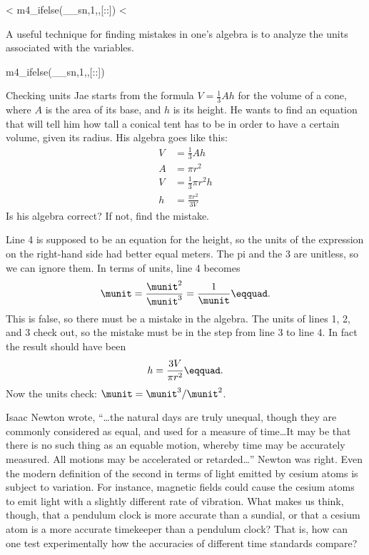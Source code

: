 <%
m4_ifelse(__sn,1,,[:\vfill:])
<%

A useful technique for finding mistakes in one's algebra is to analyze
the units associated with the variables.

m4_ifelse(__sn,1,,[:\pagebreak[4]:])

\begin{eg}{Checking units}\label{eg:checking-units}
\egquestion
Jae starts from the formula $V=\frac{1}{3}Ah$ for the volume of a
cone, where $A$ is the area of its base, and $h$ is its height.
He wants to find an equation that will tell him how tall a conical
tent has to be in order to have a certain volume, given its radius.
His algebra goes like this:
\begin{align}
  V &= \frac{1}{3}Ah \\
  A &= \pi r^2 \\
  V &= \frac{1}{3}\pi r^2 h\\
  h &= \frac{\pi r^2}{3V}
\end{align}
Is his algebra correct? If not, find the mistake.

\eganswer
Line 4 is supposed to be an equation for the height, so the units of the
expression on the right-hand side had better equal meters.
The pi and the 3 are unitless, so we can ignore them.
In terms of units, line 4 becomes
\begin{equation*}
  \munit = \frac{\munit^2}{\munit^3} = \frac{1}{\munit}\eqquad.
\end{equation*}
This is false, so there must be a mistake in the algebra. The units
of lines 1, 2, and 3 check out, so the mistake must be in the step
from line 3 to line 4. In fact the result should have been
\begin{equation*}
  h = \frac{3V}{\pi r^2}\eqquad.
\end{equation*}
Now the units check: $\munit = \munit^3/\munit^2$.
\end{eg}

\startdq

\begin{dq}
Isaac Newton wrote,
``\ldots the natural days are truly unequal, though they are
commonly considered as equal, and used for a measure of
time\ldots It may be that there is no such thing as an equable
motion, whereby time may be accurately measured. All motions
may be accelerated or retarded\ldots'' Newton was right. Even
the modern definition of the second in terms of light
emitted by cesium atoms is subject to variation. For
instance, magnetic fields could cause the cesium atoms to
emit light with a slightly different rate of vibration. What
makes us think, though, that a pendulum clock is more
accurate than a sundial, or that a cesium atom is a more
accurate timekeeper than a pendulum clock? That is, how can
one test experimentally how the accuracies of different
time standards compare?
\end{dq}

